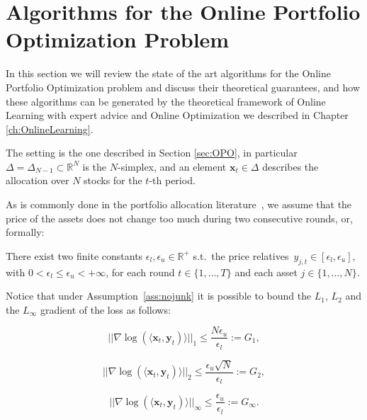 \chapter{Algorithms for the Online Portfolio Optimization Problem}\label{ch:algos}

In this section we will review the state of the art algorithms for the Online Portfolio Optimization problem and discuss their theoretical guarantees, and how these algorithms can be generated by the theoretical framework of Online Learning with expert advice and Online Optimization we described in Chapter \ref{ch:OnlineLearning}.

The setting is the one described in Section \ref{sec:OPO}, in particular $\Delta=\Delta_{N-1}\subset \mathbb R^N$ is the $N$-simplex, and an element $\mathbf x_t\in\Delta$ describes the allocation over $N$ stocks for the $t$-th period.

As is commonly done in the portfolio allocation literature~\cite{agarwal2006algorithms}, we assume that the price of the assets does not change too much during two consecutive rounds, or, formally:

\begin{assumption} \label{ass:nojunk}
     There exist two finite constants $\epsilon_l, \epsilon_u \in \mathbb{R}^+$ s.t.~the price relatives~$y_{j,t} \in [\epsilon_l, \epsilon_u]$, with $0 < \epsilon_l \leq \epsilon_u < +\infty$, for each round $t \in \{ 1, \ldots, T \}$ and each asset $j \in \{1, \ldots, N \}$.
\end{assumption}

Notice that under Assumption~\ref{ass:nojunk} it is possible to bound the $L_1$, $L_2$ and the $L_\infty$ gradient of the loss as follows:

\begin{equation} \label{eq:bounded_gradient_1}
    ||\nabla \log (\langle \mathbf{x}_t, \mathbf{y}_t) \rangle||_1 \leq \frac{N\epsilon_u}{\epsilon_l}:=G_1,
\end{equation}

\begin{equation} \label{eq:bounded_gradient_2}
    ||\nabla \log (\langle \mathbf{x}_t, \mathbf{y}_t) \rangle||_2 \leq \frac{\epsilon_u \sqrt{N}}{\epsilon_l}:=G_2,
\end{equation}

\begin{equation} \label{eq:bounded_gradient_3}
    ||\nabla \log (\langle \mathbf{x}_t, \mathbf{y}_t) \rangle||_\infty \leq \frac{\epsilon_u }{\epsilon_l}:=G_\infty.
\end{equation}

